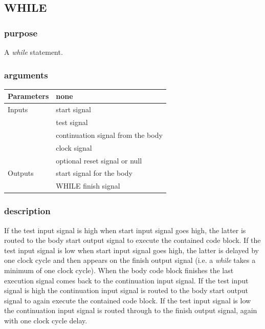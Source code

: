         \subsection{WHILE}

            \subsubsection{purpose}
            
                A {\em while} statement.

            \subsubsection{arguments}
            
                \begin{tabular}{| l | l |}
                \hline
                Parameters  & none \\
                \hline
                Inputs      & start signal \\
                            & test signal \\
                            & continuation signal from the body \\
                            & clock signal \\
                            & optional reset signal or null \\
                \hline
                Outputs     & start signal for the body \\
                            & WHILE finish signal \\
                \hline
                \end{tabular}

            \subsubsection{description}
            
            If the test input signal is high when start input signal goes high,
            the latter is routed to the body start output signal to execute the
            contained code block. If the test input signal is low when start
            input signal goes high, the latter is delayed by one clock cycle and
            then appears on the finish output signal (i.e. a {\em while} takes a
            minimum of one clock cycle). When the body code block finishes the
            last execution signal comes back to the continuation input signal.
            If the test input signal is high the continuation input signal is
            routed to the body start output signal to again execute the
            contained code block. If the test input signal is low the
            continuation input signal is routed through to the finish output
            signal, again with one clock cycle delay.

